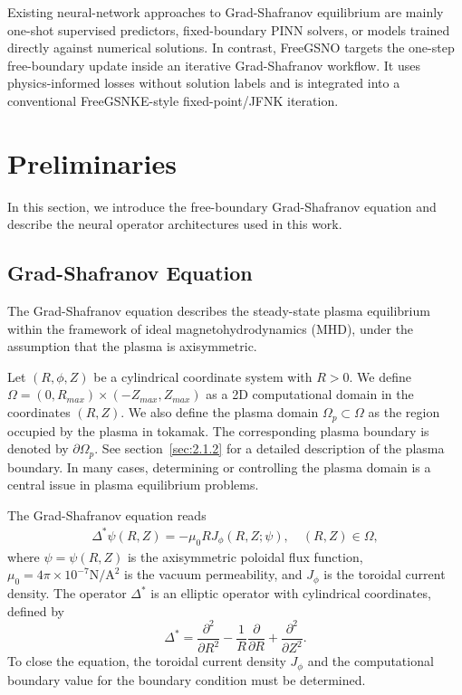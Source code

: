 Existing neural-network approaches to Grad-Shafranov equilibrium are mainly 
one-shot supervised predictors, fixed-boundary PINN solvers, 
or models trained directly against numerical solutions. 
In contrast, FreeGSNO targets the one-step free-boundary update 
inside an iterative Grad-Shafranov workflow. 
It uses physics-informed losses without solution labels 
and is integrated into a conventional FreeGSNKE-style fixed-point/JFNK iteration.

\section{Preliminaries}\label{sec:3}

In this section, we introduce the free-boundary Grad-Shafranov equation and describe the
neural operator architectures used in this work.

\subsection{Grad-Shafranov Equation}
The Grad-Shafranov equation describes the steady-state plasma equilibrium within
the framework of ideal magnetohydrodynamics (MHD), under the assumption that
the plasma is axisymmetric.

Let $(R, \phi, Z)$ be a cylindrical coordinate system with $R > 0$.
We define $\Omega = (0, R_{max})\times (-Z_{max}, Z_{max})$ as a 2D computational domain 
in the coordinates $(R, Z)$. We also define the plasma domain $\Omega_p\subset \Omega$ 
as the region occupied by the plasma in tokamak.
The corresponding plasma boundary is denoted by $\partial \Omega_p$. 
See section~\ref{sec:2.1.2} for a detailed description of the plasma boundary.
In many cases, determining or controlling the plasma domain is a central issue
in plasma equilibrium problems.

The Grad-Shafranov equation reads
\begin{align}\label{eq:1}
  \Delta^* \psi(R, Z) = -\mu_0 R J_\phi(R, Z; \psi), \quad (R, Z) \in \Omega,
\end{align}
where $\psi = \psi(R, Z)$ is the axisymmetric poloidal flux function,
$\mu_0 = 4\pi \times 10^{-7} \mathrm{N/A^2}$ is the vacuum permeability, 
and $J_\phi$ is the toroidal current density.
The operator $\Delta^*$ is an elliptic operator with cylindrical coordinates, defined by
\[
\Delta^* = \frac{\partial^2}{\partial R^2} - \frac{1}{R}\frac{\partial}{\partial R} + 
\frac{\partial^2}{\partial Z^2}.
\]
To close the equation, the toroidal current density $J_\phi$ 
and the computational boundary value for the boundary condition
must be determined. 

